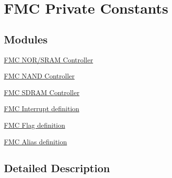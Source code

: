 \hypertarget{group___f_m_c___l_l___private___constants}{}\section{F\+MC Private Constants}
\label{group___f_m_c___l_l___private___constants}
\subsection*{Modules}
\begin{DoxyCompactItemize}
\item 
\hyperlink{group___f_m_c___l_l___n_o_r___s_r_a_m___controller}{F\+M\+C N\+O\+R/\+S\+R\+A\+M Controller}
\item 
\hyperlink{group___f_m_c___l_l___n_a_n_d___controller}{F\+M\+C N\+A\+N\+D Controller}
\item 
\hyperlink{group___f_m_c___l_l___s_d_r_a_m___controller}{F\+M\+C S\+D\+R\+A\+M Controller}
\item 
\hyperlink{group___f_m_c___l_l___interrupt__definition}{F\+M\+C Interrupt definition}
\item 
\hyperlink{group___f_m_c___l_l___flag__definition}{F\+M\+C Flag definition}
\item 
\hyperlink{group___f_m_c___l_l___alias__definition}{F\+M\+C Alias definition}
\end{DoxyCompactItemize}


\subsection{Detailed Description}
